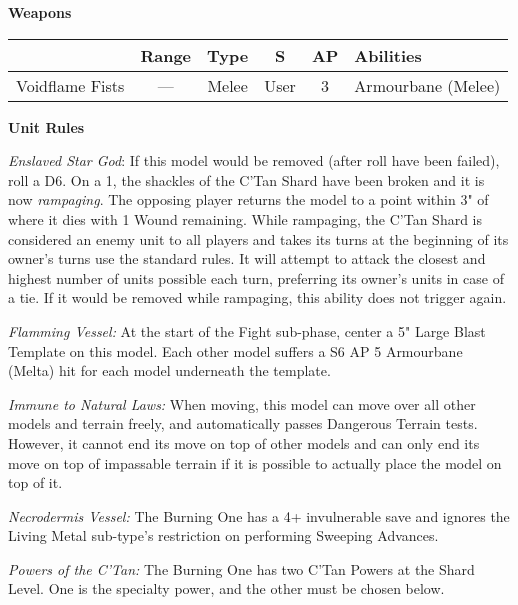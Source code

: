 \begin{minipage}[t]{0.72\textwidth}
	\vspace*{2em}
	\textbf{Weapons}
	
	\begin{tabular}{m{95 pt} *{4}{c} >{\raggedright\arraybackslash}p{130pt}}
		& Range & Type & S & AP & Abilities \\
		\hline
		Voidflame Fists & — & Melee & User & 3 & Armourbane (Melee) \\
	\end{tabular}
	
	\vspace*{2em}
	\textbf{Unit Rules}
	
	\textit{Enslaved Star God}: If this model would be removed (after  roll have been failed), roll a D6. On a 1, the shackles of the C'Tan Shard have been broken and it is now \textit{rampaging}. The opposing player returns the model to a point within 3" of where it dies with 1 Wound remaining. While rampaging, the C'Tan Shard is considered an enemy unit to all players and takes its turns at the beginning of its owner's turns use the standard rules. It will attempt to attack the closest and highest number of units possible each turn, preferring its owner's units in case of a tie. If it would be removed while rampaging, this ability does not trigger again.
	
	\textit{Flamming Vessel:} At the start of the Fight sub-phase, center a 5" Large Blast Template on this model. Each other model suffers a S6 AP 5 Armourbane (Melta) hit for each model underneath the template.
	
	\textit{Immune to Natural Laws:} When moving, this model can move over all other models and terrain freely, and automatically passes Dangerous Terrain tests. However, it cannot end its move on top of other models and can only end its move on top of impassable terrain if it is possible to actually place the model on top of it.
	
	\textit{Necrodermis Vessel:} The Burning One has a 4+ invulnerable save and ignores the Living Metal sub-type's restriction on performing Sweeping Advances.
	
	\textit{Powers of the C'Tan:} The Burning One has two C'Tan Powers at the Shard Level. One is the  specialty power, and the other must be chosen below.
	

\end{minipage}
